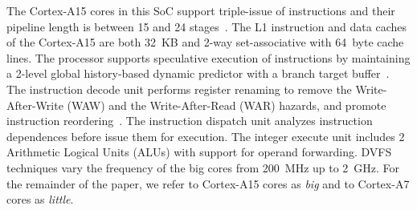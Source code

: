 The Cortex-A15 cores in this SoC support triple-issue of instructions and their pipeline length is 
between 15 and 24 stages~\cite{MPR_A15}. The L1 instruction and data caches of the Cortex-A15 are 
both 32~KB and 2-way set-associative with 64~byte cache lines. The processor supports speculative 
execution of instructions by maintaining a 2-level global history-based dynamic predictor 
with a branch target buffer~\cite{TRM_A15}. The instruction decode unit performs register renaming 
to remove the Write-After-Write (WAW) and the Write-After-Read (WAR) hazards, and promote 
instruction reordering~\cite{TRM_A15}. The instruction dispatch unit analyzes instruction dependences 
before issue them for execution.  The integer execute unit includes 2 
Arithmetic Logical Units (ALUs) with support for operand forwarding. DVFS techniques vary the 
frequency of the big cores from 200~MHz up to 2~GHz.
For the remainder of the paper, we refer to Cortex-A15 cores as \textit{big} and to Cortex-A7 cores as \textit{little}.







